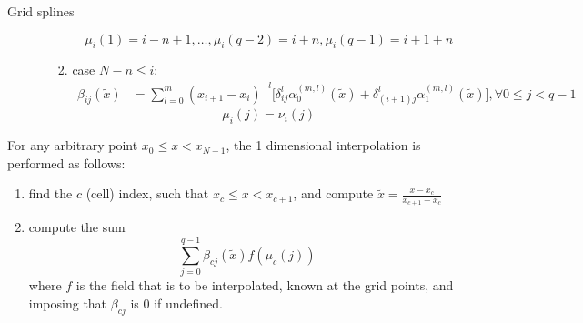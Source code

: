 \documentclass[11pt]{article}
\begin{document}
\begin{small}
\begin{paragraph}{Grid splines}
\begin{enumerate}
\begin{enumerate}
\begin{enumerate}
\begin{equation}
                                    \mu_i(1) = i-n+1,
                                    \ldots,
                                    \mu_i(q-2) = i+n,
                                    \mu_i(q-1) = i+1+n
                                \end{equation}
                            \item
                                case $N-n \leq i$:
                                \begin{align}
                                    \beta_{ij}(\tilde{x}) &=
                                        \sum_{l = 0}^m
                                        (x_{i+1} - x_i)^{-l}
                                        \Big[\delta_{ij}^l \alpha_0^{(m, l)}(\tilde{x}) +
                                             \delta_{(i+1)j}^l \alpha_1^{(m, l)}(\tilde{x})\Big],
                                    \forall 0 \leq j < q-1
                                \end{align}
                                \begin{equation}
                                    \mu_i(j) = \nu_i(j)
                                \end{equation}
                        \end{enumerate}
                \end{enumerate}
        \end{enumerate}
        For any arbitrary point $x_0 \leq x < x_{N-1}$, the 1 dimensional interpolation is performed as follows:
        \begin{enumerate}
            \item
                find the $c$ (cell) index, such that $x_c \leq x < x_{c+1}$, and compute
                $\tilde{x} = \frac{x - x_c}{x_{c+1} - x_c}$
            \item
                compute the sum
                \begin{equation}
                    \sum_{j=0}^{q-1} \beta_{cj} (\tilde{x}) f(\mu_{c}(j))
                \end{equation}
                where $f$ is the field that is to be interpolated, known at the grid points, and
                imposing that $\beta_{cj}$ is 0 if undefined.
        \end{enumerate}
    \end{paragraph}
\end{small}
\end{document}
